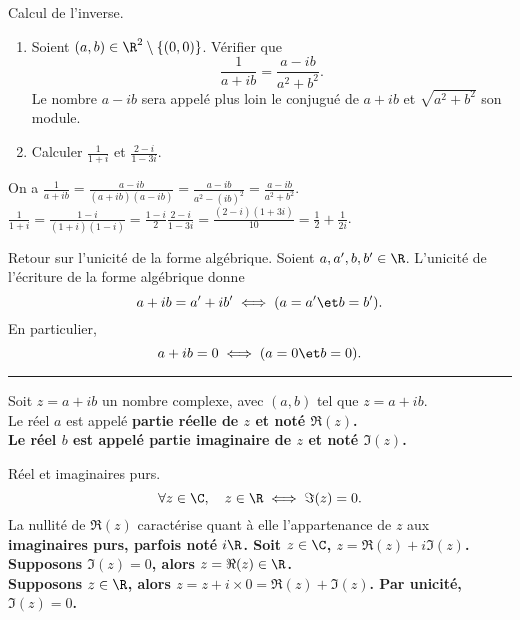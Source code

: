 \documentclass[11pt]{article}
\begin{document}
\begin{ex}{Calcul de l'inverse.}{}
    \begin{enumerate}
        \item Soient $(a,b)\in\R^2\setminus\{(0,0)\}$. Vérifier que
        \begin{equation*}
            \frac{1}{a+ib}=\frac{a-ib}{a^2+b^2}.
        \end{equation*}
        Le nombre $a-ib$ sera appelé plus loin le conjugué de $a+ib$ et $\sqrt{a^2+b^2}$ son module.
        \item Calculer $\frac{1}{1+i}$ et $\frac{2-i}{1-3i}$.
    \end{enumerate}
    \tcblower
     On a $\frac{1}{a+ib}=\frac{a-ib}{(a+ib)(a-ib)}=\frac{a-ib}{a^2-(ib)^2}=\frac{a-ib}{a^2+b^2}$.\\
     $\frac{1}{1+i}=\frac{1-i}{(1+i)(1-i)}=\frac{1-i}{2}$\quad\et\quad$\frac{2-i}{1-3i}=\frac{(2-i)(1+3i)}{10}=\frac{1}{2}+\frac{1}{2i}$.
\end{ex}

\begin{prop}{Retour sur l'unicité de la forme algébrique.}{}
    Soient $a,a',b,b'\in\R$. L'unicité de l'écriture de la forme algébrique donne
    \begin{equation*}
        a+ib = a'+ib' \iff (a=a'\et b=b').
    \end{equation*}
    En particulier,
    \begin{equation*}
        a+ib=0\iff(a=0\et b=0).
    \end{equation*}
    \hrule\vspace*{0.2cm}
    Soit $z=a+ib$ un nombre complexe, avec $(a,b)$ tel que $z=a+ib$.\\
    Le réel $a$ est appelé \bf{partie réelle} de $z$ et noté $\Re(z)$.\\
    Le réel $b$ est appelé \bf{partie imaginaire} de $z$ et noté $\Im(z)$.
\end{prop}

\begin{prop}{Réel et imaginaires purs.}{}
    \begin{equation*}
        \forall z \in \C, \quad z\in\R\iff \Im(z)=0.
    \end{equation*}
    La nullité de $\Re(z)$ caractérise quant à elle l'appartenance de $z$ aux \bf{imaginaires purs}, parfois noté $i\R$.
    \tcblower
    Soit $z\in\C$, $z=\Re(z)+i\Im(z)$.\\
    Supposons $\Im(z)=0$, alors $z=\Re(z)\in \R$.\\
    Supposons $z\in\R$, alors $z=z+i\times0=\Re(z)+\Im(z)$. Par unicité, $\Im(z)=0$.
\end{prop}
\end{document}

